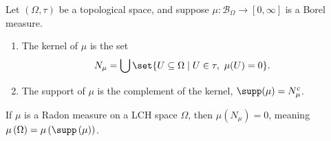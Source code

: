 \begin{definition}
  Let $\left(\Omega,\tau\right)$ be a topological space, and suppose $\mu\colon \mathcal{B}_{\Omega}\rightarrow [0,\infty]$ is a Borel measure.
  \begin{enumerate}[(1)]
    \item The kernel of $\mu$ is the set
      \begin{align*}
        N_{\mu} &= \bigcup\set{U\subseteq \Omega\mid U\in\tau,~\mu(U) = 0}.
      \end{align*}
    \item The support of $\mu$ is the complement of the kernel, $\supp(\mu) = N_{\mu}^{c}$.
  \end{enumerate}
\end{definition}
\begin{fact}
  If $\mu$ is a Radon measure on a LCH space $\Omega$, then $\mu\left(N_{\mu}\right) = 0$, meaning $\mu\left(\Omega\right) = \mu\left(\supp\left(\mu\right)\right)$.
\end{fact}

